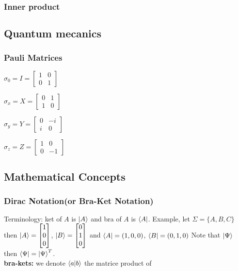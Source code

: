 \documentclass[5pt]{article}
\begin{document}
\begin{multicols}{3}
\subsubsection{Inner product}





\subsection{Quantum mecanics}
\subsubsection{Pauli Matrices}
\begin{itemize*}
     \item $\sigma_0 = I = \begin{bmatrix}1 & 0 \\ 0 & 1\end{bmatrix}$
     \item $\sigma_x = X = \begin{bmatrix}0 & 1 \\ 1 & 0\end{bmatrix}$
     \item $\sigma_y = Y = \begin{bmatrix}0 & -i \\ i & 0\end{bmatrix}$
     \item $\sigma_z = Z = \begin{bmatrix}1 & 0 \\ 0 & -1\end{bmatrix}$
\end{itemize*}




\newpage





\subsection{Mathematical Concepts}

\subsubsection{Dirac Notation\footnotesize{(or Bra-Ket Notation)}}
Terminology: ket of $A$ is $\ket{A}$ and bra of $A$ is $\bra{A}$.
Example, let $\Sigma=\{A,B,C\}$ then $\ket{A}=\begin{bmatrix}1\\0\\0 \end{bmatrix}$, $\ket{B}=\begin{bmatrix}0\\1\\0 \end{bmatrix}$
and $\bra{A}=(1,0,0)$, $\bra{B}=(0,1,0)$
Note that $\ket{\Psi}$ then $\bra{\Psi}=\ket{\Psi}^T$.\\
\textbf{bra-kets:} we denote $\braket{a}{b}$ the matrice product of 



\end{multicols}
\end{document}
